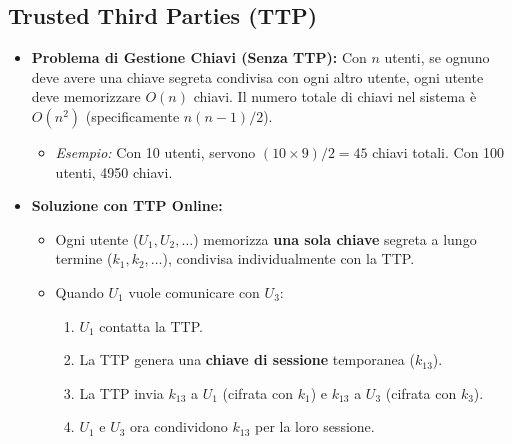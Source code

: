 \subsection{Trusted Third Parties (TTP)}
\begin{itemize}
    \item \textbf{Problema di Gestione Chiavi (Senza TTP):} Con $n$ utenti, se ognuno deve avere una chiave segreta condivisa con ogni altro utente, ogni utente deve memorizzare $O(n)$ chiavi. Il numero totale di chiavi nel sistema è $O(n^2)$ (specificamente $n(n-1)/2$).
        \begin{itemize}
            \item \textit{Esempio:} Con 10 utenti, servono $(10 \times 9)/2 = 45$ chiavi totali. Con 100 utenti, 4950 chiavi.
        \end{itemize}
    \item \textbf{Soluzione con TTP Online:}
        \begin{itemize}
            \item Ogni utente ($U_1, U_2, \dots$) memorizza \textbf{una sola chiave} segreta a lungo termine ($k_1, k_2, \dots$), condivisa individualmente con la TTP.
            \item Quando $U_1$ vuole comunicare con $U_3$:
                \begin{enumerate}
                    \item $U_1$ contatta la TTP.
                    \item La TTP genera una \textbf{chiave di sessione} temporanea ($k_{13}$).
                    \item La TTP invia $k_{13}$ a $U_1$ (cifrata con $k_1$) e $k_{13}$ a $U_3$ (cifrata con $k_3$).
                    \item $U_1$ e $U_3$ ora condividono $k_{13}$ per la loro sessione.
                \end{enumerate}
        \end{itemize}
        \begin{figure}[H]
            \centering
\end{figure}
\end{itemize}
